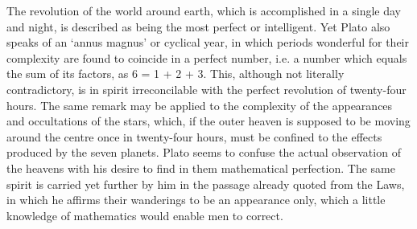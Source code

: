 The revolution of the world around earth, which is accomplished in a
single day and night, is described as being the most perfect or
intelligent. Yet Plato also speaks of an ‘annus magnus’ or cyclical year,
in which periods wonderful for their complexity are found to coincide in a
perfect number, i.e. a number which equals the sum of its factors, as 6 =
1 + 2 + 3. This, although not literally contradictory, is in spirit
irreconcilable with the perfect revolution of twenty-four hours. The same
remark may be applied to the complexity of the appearances and
occultations of the stars, which, if the outer heaven is supposed to be
moving around the centre once in twenty-four hours, must be confined to
the effects produced by the seven planets. Plato seems to confuse the
actual observation of the heavens with his desire to find in them
mathematical perfection. The same spirit is carried yet further by him in
the passage already quoted from the Laws, in which he affirms their
wanderings to be an appearance only, which a little knowledge of
mathematics would enable men to correct.

